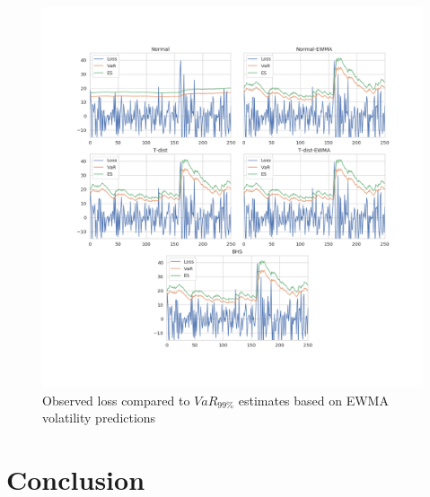 \documentclass[a4paper]{article}
\begin{document}
\begin{figure}[H]
    \includegraphics[width=\textwidth]{plot.png}
    \caption{Observed loss compared to $VaR_{99\%}$ estimates based on EWMA volatility predictions}
    \label{var2}
\end{figure}

\section{Conclusion}
\end{document}
